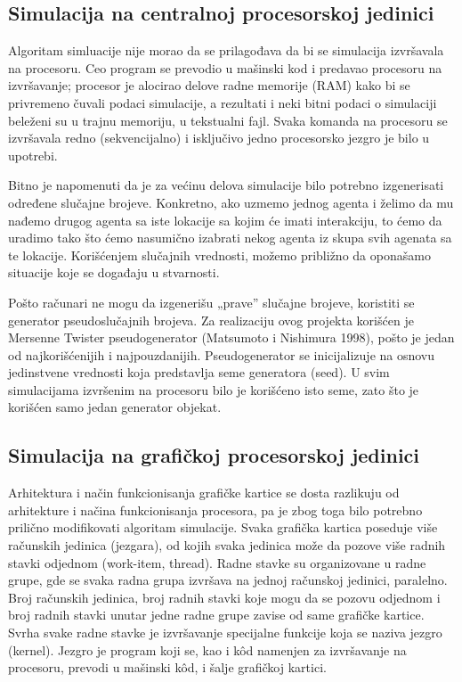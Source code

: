 \subsection{Simulacija na centralnoj procesorskoj jedinici}

Algoritam simluacije nije morao da se prilagođava da bi se simulacija izvršavala
na procesoru. Ceo program se prevodio u mašinski kod i predavao procesoru na
izvršavanje; procesor je alocirao delove radne memorije (RAM) kako bi se privremeno
čuvali podaci simulacije, a rezultati i neki bitni podaci o simulaciji beleženi su u trajnu
memoriju, u tekstualni fajl. Svaka komanda na procesoru se izvršavala redno
(sekvencijalno) i isključivo jedno procesorsko jezgro je bilo u upotrebi.

Bitno je napomenuti da je za većinu delova simulacije bilo potrebno izgenerisati
određene slučajne brojeve. Konkretno, ako uzmemo jednog agenta i želimo da mu
nađemo drugog agenta sa iste lokacije sa kojim će imati interakciju, to ćemo da uradimo
tako što ćemo nasumično izabrati nekog agenta iz skupa svih agenata sa te lokacije.
Korišćenjem slučajnih vrednosti, možemo približno da oponašamo situacije koje se
događaju u stvarnosti.

Pošto računari ne mogu da izgenerišu „prave” slučajne brojeve, koristiti se
generator pseudoslučajnih brojeva. Za realizaciju ovog projekta korišćen je Mersenne
Twister pseudogenerator (Matsumoto i Nishimura 1998), pošto je jedan od najkorišćenijih i
najpouzdanijih. Pseudogenerator se inicijalizuje na osnovu jedinstvene vrednosti koja
predstavlja seme generatora (seed). U svim simulacijama izvršenim na procesoru bilo je
korišćeno isto seme, zato što je korišćen samo jedan generator objekat.

\subsection{Simulacija na grafičkoj procesorskoj jedinici}

Arhitektura i način funkcionisanja grafičke kartice se dosta razlikuju od
arhitekture i načina funkcionisanja procesora, pa je zbog toga bilo potrebno prilično
modifikovati algoritam simulacije. Svaka grafička kartica poseduje više računskih
jedinica (jezgara), od kojih svaka jedinica može da pozove više radnih stavki odjednom
(work-item, thread). Radne stavke su organizovane u radne grupe, gde se svaka radna
grupa izvršava na jednoj računskoj jedinici, paralelno. Broj računskih jedinica, broj
radnih stavki koje mogu da se pozovu odjednom i broj radnih stavki unutar jedne radne
grupe zavise od same grafičke kartice. Svrha svake radne stavke je izvršavanje
specijalne funkcije koja se naziva jezgro (kernel). Jezgro je program koji se, kao i kôd
namenjen za izvršavanje na procesoru, prevodi u mašinski kôd, i šalje grafičkoj kartici.

